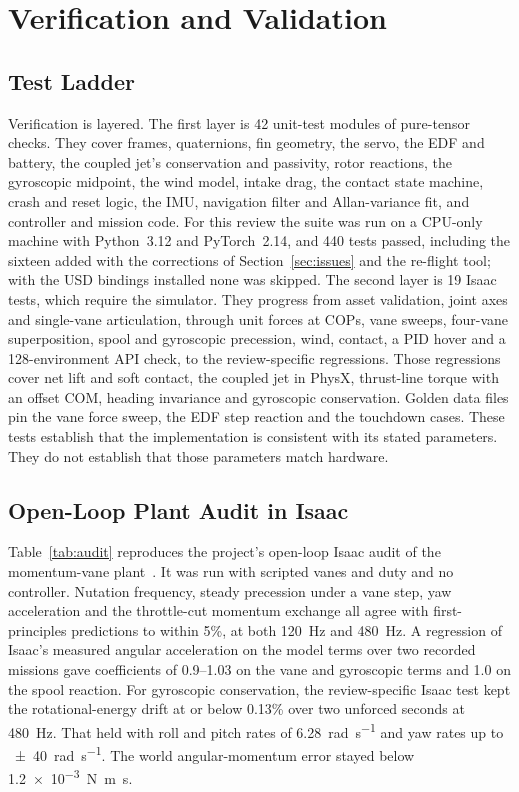 \documentclass[journal]{IEEEtran}
\newcommand{\refsec}[1]{Section~\ref{#1}}
\newcommand{\reftab}[1]{Table~\ref{#1}}
\begin{document}
\section{Verification and Validation}
\label{sec:verification}

\subsection{Test Ladder}

Verification is layered.
The first layer is 42 unit-test modules of pure-tensor checks.
They cover frames, quaternions, fin geometry, the servo, the EDF and battery, the coupled jet's conservation and passivity, rotor reactions, the gyroscopic midpoint, the wind model, intake drag, the contact state machine, crash and reset logic, the IMU, navigation filter and Allan-variance fit, and controller and mission code.
For this review the suite was run on a CPU-only machine with Python~3.12 and PyTorch~2.14, and 440 tests passed, including the sixteen added with the corrections of \refsec{sec:issues} and the re-flight tool; with the USD bindings installed none was skipped.
The second layer is 19 Isaac tests, which require the simulator.
They progress from asset validation, joint axes and single-vane articulation, through unit forces at COPs, vane sweeps, four-vane superposition, spool and gyroscopic precession, wind, contact, a PID hover and a 128-environment API check, to the review-specific regressions.
Those regressions cover net lift and soft contact, the coupled jet in PhysX, thrust-line torque with an offset COM, heading invariance and gyroscopic conservation.
Golden data files pin the vane force sweep, the EDF step reaction and the touchdown cases.
These tests establish that the implementation is consistent with its stated parameters.
They do not establish that those parameters match hardware.

\subsection{Open-Loop Plant Audit in Isaac}

\reftab{tab:audit} reproduces the project's open-loop Isaac audit of the momentum-vane plant~\cite{tang2026rl}.
It was run with scripted vanes and duty and no controller.
Nutation frequency, steady precession under a vane step, yaw acceleration and the throttle-cut momentum exchange all agree with first-principles predictions to within 5\%, at both \SI{120}{\hertz} and \SI{480}{\hertz}.
A regression of Isaac's measured angular acceleration on the model terms over two recorded missions gave coefficients of 0.9--1.03 on the vane and gyroscopic terms and 1.0 on the spool reaction.
For gyroscopic conservation, the review-specific Isaac test kept the rotational-energy drift at or below 0.13\% over two unforced seconds at \SI{480}{\hertz}.
That held with roll and pitch rates of \SI{6.28}{\radian\per\second} and yaw rates up to \SI{\pm40}{\radian\per\second}.
The world angular-momentum error stayed below \SI{1.2e-3}{\newton\metre\second}.
\end{document}

